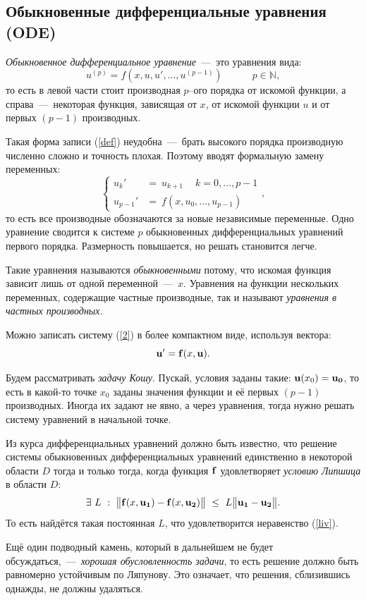 \documentclass[a4paper,9pt,russian]{article}
\begin{document}
\subsection{Обыкновенные дифференциальные уравнения (ODE)}
    {\it Обыкновенное дифференциальное уравнение}~---~это уравнения вида: \\
        \begin{equation}\label{def}
            u^{(p)} = f(x, u, u',\dots, u^{(p-1)}) \quad\quad\quad
            p \in \mathbb{N},
        \end{equation}
    то есть в левой части стоит производная $p$--ого порядка от искомой функции, а справа~---~некоторая функция, зависящая от $x$, от искомой функции $u$ и от первых $(p-1)$ производных.\par
    Такая форма записи (\ref{def}) неудобна~---~брать высокого порядка производную численно сложно и точность плохая. Поэтому вводят формальную замену переменных:
    \begin{equation}\label{2}
        \begin{cases}
            u_k' &=\ u_{k+1} \quad\ k = 0, \ldots, p-1\\
            u_{p-1}'& =\ f(x,u_0,\ldots, u_{p-1})
        \end{cases},
    \end{equation}
    то есть все производные обозначаются за новые независимые переменные. Одно уравнение сводится к системе $p$ обыкновенных дифференциальных уравнений первого порядка. Размерность повышается, но решать становится легче.\par
    Такие уравнения называются {\it обыкновенными} потому, что искомая функция зависит лишь от одной переменной~---~$x$. Уравнения на функции нескольких переменных, содержащие частные производные, так и называют {\it уравнения в частных производных}.\par
    Можно записать систему (\ref{2}) в более компактном виде, используя вектора: $${\bf u}' = {\bf f}(x, {\bf u}).$$\par
    Будем рассматривать {\it задачу Кошу}. Пускай, условия заданы такие: ${\bf u}(x_0)={\bf u_0}$, то есть в какой-то точке $x_0$ заданы значения функции и её первых $(p-1)$ производных. Иногда их задают не явно, а через уравнения, тогда нужно решать систему уравнений в начальной точке.\par
    Из курса дифференциальных уравнений должно быть известно, что решение системы обыкновенных дифференциальных уравнений единственно в некоторой области $D$ тогда и только тогда, когда функция ${\bf f}$ удовлетворяет {\it условию Липшица} в области $D$:
    \begin{equation}\label{liv}
        \exists\ L\ :\ \bigl\|{\bf f}(x, {\bf u_1}) - {\bf f}(x, {\bf u_2})\bigr\| \  \le \ L\bigl\|{\bf u_1}-{\bf u_2}\bigr\|.
    \end{equation}
    То есть найдётся такая постоянная $L$, что удовлетворится неравенство (\ref{liv}).
    \par
    Ещё один подводный камень, который в дальнейшем не будет обсуждаться,~---~{\it хорошая обусловленность задачи}, то есть решение должно быть равномерно устойчивым по Ляпунову. Это означает, что решения, сблизившись однажды, не должны удаляться.
\end{document}
